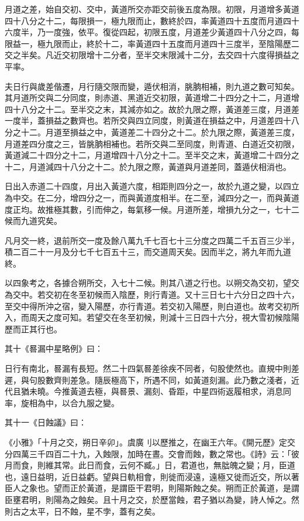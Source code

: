 \begin{pinyinscope}
 月道之差，始自交初、交中，黃道所交亦距交前後五度為限。初限，月道增多黃道四十八分之十二，每限損一，極九限而止，數終於四，率黃道四十五度而月道四十六度半，乃一度強，依平。復從四起，初限五度，月道差少黃道四十八分之四，每限益一，極九限而止，終於十二，率黃道四十五度而月道四十三度半，至陰陽歷二交之半矣。凡近交初限增十二分者，至半交末限減十二分，去交四十六度得損益之平率。



 夫日行與歲差偕遷，月行隨交限而變，遁伏相消，朓朒相補，則九道之數可知矣。其月道所交與二分同度，則赤道、黑道近交初限，黃道增二十四分之十二，月道增四十八分之十二。至半交之末，其減亦如之。故於九限之際，黃道差三度，月道差一度半，蓋損益之數齊也。若所交與四立同度，則黃道在損益之中，月道差四十八分之十二。月道至損益之中，黃道差二十四分之十二。於九限之際，黃道差三度，月道差四分度之三，皆朓朒相補也。若所交與二至同度，則青道、白道近交初限，黃道減二十四分之十二，月道增四十八分之十二。至半交之末，黃道增二十四分之十二，月道減四十八分之十二。於九限之際，黃道與月道差同，蓋遁伏相消也。



 日出入赤道二十四度，月出入黃道六度，相距則四分之一，故於九道之變，以四立為中交。在二分，增四分之一，而與黃道度相半。在二至，減四分之一，而與黃道度正均。故推極其數，引而伸之，每氣移一候。月道所差，增損九分之一，七十二候而九道究矣。



 凡月交一終，退前所交一度及餘八萬九千七百七十三分度之四萬二千五百三少半，積二百二十一月及分七千七百五十三，而交道周天矣。因而半之，將九年而九道終。



 以四象考之，各據合朔所交，入七十二候。則其八道之行也。以朔交為交初，望交為交中。若交初在冬至初候而入陰歷，則行青道。又十三日七十六分日之四十六，至交中得所沖之宿，變入陽歷，亦行青道。若交初入陽歷，則白道也。故考交初所入，而周天之度可知。若望交在冬至初候，則減十三日四十六分，視大雪初候陰陽歷而正其行也。



 其十《晷漏中星略例》曰：



 日行有南北，晷漏有長短。然二十四氣晷差徐疾不同者，句股使然也。直規中則差遲，與句股數齊則差急。隨辰極高下，所遇不同，如黃道刻漏。此乃數之淺者，近代且猶未曉。今推黃道去極，與晷景、漏刻、昏距，中星四術返履相求，消息同率，旋相為中，以合九服之變。



 其十一《日蝕議》曰：



 《小雅》「十月之交，朔日辛卯」。虞廣刂以歷推之，在幽王六年。《開元歷》定交分四萬三千四百二十九，入蝕限，加時在晝。交會而蝕，數之常也。《詩》云：「彼月而食，則維其常。此日而食，云何不臧。」日，君道也，無朏魄之變；月，臣道也，遠日益明，近日益虧。望與日軌相會，則徙而浸遠，遠極又徙而近交，所以著臣人之象也。望而正於黃道，是謂臣干君明，則陽斯蝕之矣。朔而正於黃道，是謂臣壅君明，則陽為之蝕矣。且十月之交，於歷當蝕，君子猶以為變，詩人悼之。然則古之太平，日不蝕，星不孛，蓋有之矣。




\end{pinyinscope}
